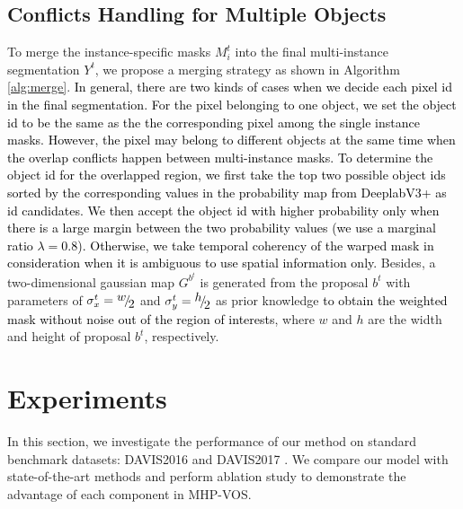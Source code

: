 \documentclass[10pt,twocolumn,letterpaper]{article}
\newcommand{\ldz}[1]{\textcolor{black}{#1}}
\begin{document}
\subsection{Conflicts Handling for Multiple Objects}
\label{multiple_objects}
\vspace{-5pt}

To merge the instance-specific masks $M^t_i$ into the final multi-instance segmentation $Y^{t}$, we propose a merging strategy as shown in Algorithm \ref{alg:merge}. 
\ldz{In general, there are two kinds of cases when we decide each pixel id in the final segmentation. For the pixel belonging to one object, we set the object id to be the same as the the corresponding pixel among the single instance masks. However, the pixel may belong to different objects at the same time when the overlap conflicts happen between multi-instance masks. To determine the object id for the overlapped region, we first take the top two possible object ids sorted by the corresponding values in the probability map from DeeplabV3+ as id candidates. 
We then accept the object id with higher probability only when there is a large margin between the two probability values (we use a marginal ratio $\lambda=0.8$). Otherwise, we take temporal coherency of the warped mask in consideration when it is ambiguous to use spatial information only.}
Besides, a two-dimensional gaussian map ${G^{{b^{{t}}}}}$ is generated from the proposal ${b^{{t}}}$ with parameters of $\sigma _x^t = {\raise0.7ex\hbox{$w$} \!\mathord{\left/ {\vphantom {w 2}}\right.\kern-\nulldelimiterspace} \!\lower0.7ex\hbox{$2$}}$ and $\sigma _y^t = {\raise0.7ex\hbox{$h$} \!\mathord{\left/ {\vphantom {h 2}}\right.\kern-\nulldelimiterspace} \!\lower0.7ex\hbox{$2$}}$ as prior knowledge \ldz{to obtain the weighted mask without noise out of the region of interests}, where $w$ and $h$ are the width and height of proposal ${b^{{t}}}$, respectively. 







\vspace{-10pt}
\section{Experiments}
\vspace{-7pt}
In this section, we investigate the performance of our method on standard benchmark datasets: DAVIS2016 \cite{perazzi2016benchmark} and DAVIS2017 \cite{caelles20182018}. We compare our model with state-of-the-art methods and perform ablation study to demonstrate the advantage of each component in MHP-VOS. 
\end{document}
